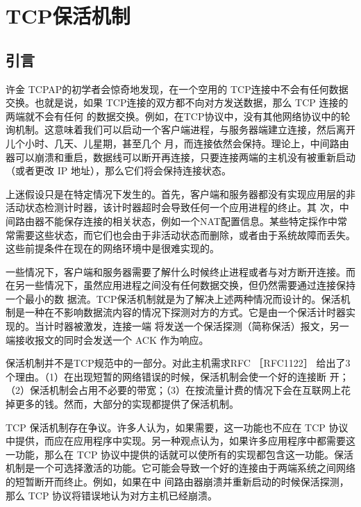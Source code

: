 \chapter{TCP保活机制}

\section{引言}
许金 TCPAP的初学者会惊奇地发现，在一个空用的 TCP连接中不会有任何数据交换。也就是说，如果 TCP连接的双方都不向对方发送数据，那么 TCP 连接的两端就不会有任何
的数据交换。例如，在TCP协议中，没有其他网络协议中的轮询机制。这意味着我们可以启动一个客户端进程，与服务器端建立连接，然后离开儿个小时、几天、儿星期，甚至几个
月，而连接依然会保持。理论上，中间路由器可以崩溃和重启，数据线可以断开再连接，只要连接两端的主机没有被重新启动（或者更改 IP 地址），那么它们将会保持连接状态。

\begin{tcolorbox}
    上迷假设只是在特定情况下发生的。首先，客户端和服务器都没有实现应用层的非活动状态检测计时器，该计时器超时会导致任何一个应用进程的终止。其
    次，中间路由器不能保存连接的相关状态，例如一个NAT配置信息。某些特定採作中常常需要这些状态，而它们也会由于非活动状态而删除，或者由于系统故障而丢失。这些前提条件在现在的网络环境中是很难实现的。
\end{tcolorbox}

一些情况下，客户端和服务器需要了解什么时候终止进程或者与对方断开连接。而在另一些情况下，虽然应用进程之间没有任何数据交换，但仍然需要通过连接保持一个最小的数
据流。TCP保活机制就是为了解决上述两种情况而设计的。保活机制是一种在不影响数据流内容的情况下探测对方的方式。它是由一个保活计时器实现的。当计时器被激发，连接一端
将发送一个保活探测（简称保活）报文，另一端接收报文的同时会发送一个 ACK 作为响应。

\begin{tcolorbox}
    保活机制并不是TCP规范中的一部分。对此主机需求RFC ［RFC1122］ 给出了3个理由。（1）在出现短暂的网络错误的时候，保活机制会使一个好的连接断
    开；（2）保活机制会占用不必要的带宽；（3）在按流量计费的情况下会在互联网上花掉更多的钱。然而，大部分的实现都提供了保活机制。
\end{tcolorbox}

TCP 保活机制存在争议。许多人认为，如果需要，这一功能也不应在 TCP 协议中提供，而应在应用程序中实现。另一种观点认为，如果许多应用程序中都需要这一功能，那么在
TCP 协议中提供的话就可以使所有的实现都包含这一功能。保活机制是一个可选择激活的功能。它可能会导致一个好的连接由于两端系统之间网络的短暂断开而终止。例如，如果在中
间路由器崩溃并重新启动的时候保活探测，那么 TCP 协议将错误地认为对方主机已经崩溃。

